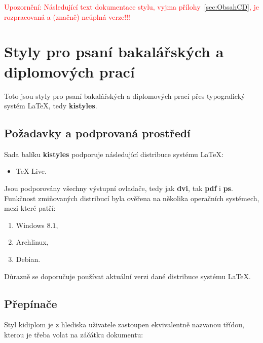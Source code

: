 \documentclass[
  biblatex,
  glossaries,
  index
]{kidiplom}
\begin{document}

\noindent\textcolor{red}{\LARGE Upozornění: Následující text
  dokumentace stylu, vyjma přílohy~\ref{sec:ObsahCD}, je rozpracovaná
  a (značně) neúplná verze!!!}

\section{Styly pro psaní bakalářských a diplomových prací}
Toto jsou styly pro psaní bakalářských a diplomových prací přes typografický systém \LaTeX{}, tedy \textbf{kistyles}.

\subsection{Požadavky a podprovaná prostředí}
Sada balíku \textbf{kistyles} podporuje následující distribuce systému \LaTeX{}:
\begin{itemize}
  \item \TeX{} Live.
\end{itemize}

Jsou podporovány všechny výstupní ovladače, tedy jak \textbf{dvi}, tak \textbf{pdf} i \textbf{ps}. Funkčnost zmiňovaných distribucí byla ověřena na několika operačních systémech, mezi které patří:
\begin{enumerate}
  \item Windows $8.1$,
  \item Archlinux,
  \item Debian.
\end{enumerate}

Důrazně se doporučuje používat aktuální verzi dané distribuce systému \LaTeX{}.


\subsection{Přepínače}
Styl kidiplom je z hlediska uživatele zastoupen ekvivalentně nazvanou třídou, kterou je třeba volat na záčátku dokumentu:
\end{document}
